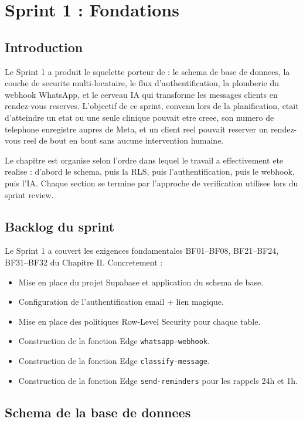 \chapter{Sprint 1 : Fondations}

\section{Introduction}
Le Sprint 1 a produit le squelette porteur de \nova : le schema de base
de donnees, la couche de securite multi-locataire, le flux
d'authentification, la plomberie du webhook WhatsApp, et le cerveau IA
qui transforme les messages clients en rendez-vous reserves. L'objectif
de ce sprint, convenu lors de la planification, etait d'atteindre un
etat ou une seule clinique pouvait etre creee, son numero de telephone
enregistre aupres de Meta, et un client reel pouvait reserver un
rendez-vous reel de bout en bout sans aucune intervention humaine.

Le chapitre est organise selon l'ordre dans lequel le travail a
effectivement ete realise : d'abord le schema, puis la RLS, puis
l'authentification, puis le webhook, puis l'IA. Chaque section se
termine par l'approche de verification utilisee lors du sprint review.

\section{Backlog du sprint}
Le Sprint 1 a couvert les exigences fondamentales BF01--BF08, BF21--BF24,
BF31--BF32 du Chapitre II. Concretement :
\begin{itemize}
  \item Mise en place du projet Supabase et application du schema de base.
  \item Configuration de l'authentification email + lien magique.
  \item Mise en place des politiques Row-Level Security pour chaque table.
  \item Construction de la fonction Edge \texttt{whatsapp-webhook}.
  \item Construction de la fonction Edge \texttt{classify-message}.
  \item Construction de la fonction Edge \texttt{send-reminders} pour les
        rappels 24h et 1h.
\end{itemize}

\section{Schema de la base de donnees}

